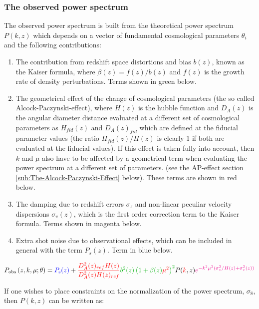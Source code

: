 \subsubsection{The observed power spectrum}

The observed power spectrum is built from the theoretical power spectrum
$P(k,z)$ which depends on a vector of fundamental cosmological parameters
$\theta_{i}$ and the following contributions:
\begin{enumerate}
\item The contribution from redshift space distortions and bias $b(z)$,
known as the Kaiser formula, where $\beta(z)=f(z)/b(z)$ and $f(z)$
is the growth rate of density perturbations. Terms shown in green
below. 
\item The geometrical effect of the change of cosmological parameters (the
so called Alcock-Paczynski-effect), where $H(z)$ is the hubble function
and $D_{A}(z)$ is the angular diameter distance evaluated at a different
set of cosmological parameters as $H_{fid}(z)$ and $D_{A}(z)_{fid}$
which are defined at the fiducial parameter values (the ratio $H_{fid}(z)/H(z)$
is clearly 1 if both are evaluated at the fiducial values). If this
effect is taken fully into account, then $k$ and $\mu$ also have
to be affected by a geometrical term when evaluating the power spectrum
at a different set of parameters. (see the AP-effect section \ref{sub:The-Alcock-Paczynski-Effect}
below). These terms are shown in red below.
\item The damping due to redshift errors $\sigma_{z}$ and non-linear peculiar
velocity dispersions $\sigma_{v}(z)$, which is the first order correction
term to the Kaiser formula. Terms shown in magenta below. 
\item Extra shot noise due to observational effects, which can be included
in general with the term $P_{s}(z)$. Term in blue below.
\end{enumerate}
\begin{equation}
P_{{\rm obs}}\left(z,k,\mu;\theta\right)=\textcolor{blue}{P_{{\rm s}}(z)}+\textcolor{red}{\frac{D_{A}^{2}(z)_{ref}H(z)}{D_{A}^{2}(z)H(z)_{ref}}}{\color{green}b^{2}(z)\left(1+\beta(z){\color{red}\mu}^{{\color{red}2}}\right)^{2}}P({\color{red}k},z){\color{magenta}e^{-k^{2}\mu^{2}(\sigma_{z}^{2}/H(z)+\sigma_{v}^{2}(z))}}\label{eq:obs-power-basic}
\end{equation}


If one wishes to place constraints on the normalization of the power
spectrum, $\sigma_{8}$, then $P(k,z)$ can be written as:

